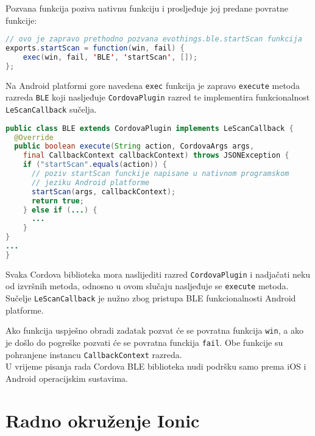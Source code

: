 Pozvana funkcija poziva nativnu funkciju i prosljeđuje joj predane povratne funkcije:
\begin{lstlisting}[language=java, morekeywords={var,function}]
// ovo je zapravo prethodno pozvana evothings.ble.startScan funkcija
exports.startScan = function(win, fail) {
	exec(win, fail, 'BLE', 'startScan', []);
};
\end{lstlisting}

Na Android platformi gore navedena \texttt{exec} funkcija je zapravo \texttt{execute} metoda razreda \texttt{BLE} koji nasljeđuje \texttt{CordovaPlugin} razred te implementira funkcionalnost \texttt{LeScanCallback} sučelja. 
\begin{lstlisting}[language=java]
public class BLE extends CordovaPlugin implements LeScanCallback {
  @Override
  public boolean execute(String action, CordovaArgs args, 
    final CallbackContext callbackContext) throws JSONException {
    if ("startScan".equals(action)) {
      // poziv startScan funckije napisane u nativnom programskom
      // jeziku Android platforme
      startScan(args, callbackContext); 
      return true;
    } else if (...) {
      ...
    }
}
...
}
\end{lstlisting}

Svaka Cordova biblioteka mora naslijediti razred \texttt{CordovaPlugin} i nadjačati neku od   izvršnih metoda, odnosno u ovom slučaju nasljeđuje se \texttt{execute} metoda. 
Sučelje \texttt{LeScanCallback} je nužno zbog pristupa BLE funkcionalnosti Android platforme.

Ako funkcija uspješno obradi zadatak pozvat će se povratna funkcija \texttt{win}, a ako je došlo do pogreške pozvati će se povratna funckija \texttt{fail}. 
Obe funkcije su pohranjene instancu \texttt{CallbackContext} razreda.
\\

U vrijeme pisanja rada Cordova BLE biblioteka nudi podršku samo prema iOS i Android operacijskim sustavima.

\section{Radno okruženje Ionic}

